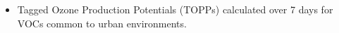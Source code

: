 \begin{BlueBox}
    \vskip-1cm
    \begin{block}{}
        \begin{itemize} 
            \item Tagged Ozone Production Potentials (TOPPs) \citep{Butler:2011} calculated over 7 days for VOCs common to urban environments. 
        \end{itemize}
    \end{block}
\end{BlueBox}
